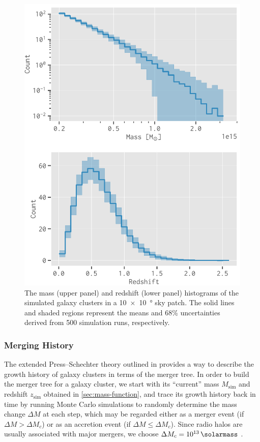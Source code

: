 \documentclass[twocolumn]{aastex62}
\newcommand{\R}[1]{\mathrm{#1}}
\begin{document}
\begin{figure}
  \centering
  \includegraphics[width=\columnwidth]{mass-z-dist}
  \caption{\label{fig:m-z-dist}%
    The mass (upper panel) and redshift (lower panel) histograms of the
    simulated galaxy clusters in a
    \SI[product-units=repeat]{10 x 10}{\degree} sky patch.
    The solid lines and shaded regions represent the means and
    68\% uncertainties derived from 500 simulation runs,
    respectively.
  }
\end{figure}

\subsubsection{Merging History}
\label{sec:merging-history}

The extended Press--Schechter theory outlined in \citet{lacey1993} provides
a way to describe the growth history of galaxy clusters in terms of the
merger tree.
In order to build the merger tree for a galaxy cluster, we start with
its \enquote{current} mass $M_{\R{sim}}$ and redshift $z_{\R{sim}}$ obtained
in \autoref{sec:mass-function}, and trace its growth history back in time
by running Monte Carlo simulations to randomly determine the mass change
$\Delta M$ at each step, which may be regarded either as a merger event
(if $\Delta M > \Delta M_c$) or as an accretion event
(if $\Delta M \leq \Delta M_c$).
Since radio halos are usually associated with major mergers, we choose
$\Delta M_c = \SI{e13}{\solarmass}$ \citep[e.g.,][]{cassano2005}.
\end{document}
